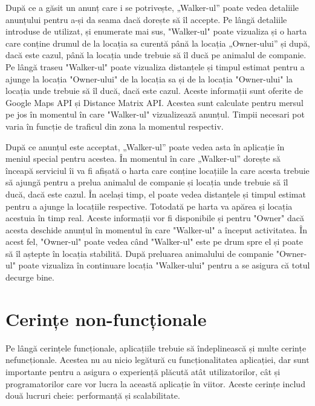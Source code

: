 După ce a găsit un anunț care i se potrivește, „Walker-ul” poate vedea detaliile anunțului pentru a-și da seama dacă dorește să îl accepte. Pe lângă detaliile introduse de utilizat, și enumerate mai sus, "Walker-ul" poate vizualiza și o harta care conține drumul de la locația sa curentă până la locația „Owner-ului” și după, dacă este cazul, până la locația unde trebuie să îl ducă pe animalul de companie. Pe lângă traseu "Walker-ul" poate vizualiza distanțele și timpul estimat pentru a ajunge la locația "Owner-ului" de la locația sa și de la locația "Owner-ului" la locația unde trebuie să îl ducă, dacă este cazul. Aceste informații sunt oferite de Google Maps API\cite{google_maps_platform} și Distance Matrix API\cite{distance_matrix}. Acestea sunt calculate pentru mersul pe jos în momentul în care "Walker-ul" vizualizează anunțul. Timpii necesari pot varia în funcție de traficul din zona la momentul respectiv.


După ce anunțul este acceptat, „Walker-ul” poate vedea asta în aplicație în meniul special pentru acestea. În momentul în care „Walker-ul” dorește să înceapă serviciul îi va fi afișată o harta care conține locațiile la care acesta trebuie să ajungă pentru a prelua animalul de companie și locația unde trebuie să îl ducă, dacă este cazul. În același timp, el poate vedea distanțele și timpul estimat pentru a ajunge la locațiile respective. Totodată pe harta va apărea și locația acestuia în timp real. Aceste informații vor fi disponibile și pentru "Owner" dacă acesta deschide anunțul în momentul în care "Walker-ul" a început activitatea. În acest fel, "Owner-ul" poate vedea când "Walker-ul" este pe drum spre el și poate să îl aștepte în locația stabilită. După preluarea animalului de companie "Owner-ul" poate vizualiza în continuare locația "Walker-ului" pentru a se asigura că totul decurge bine.



\section{Cerințe non-funcționale}
 
Pe lângă cerințele funcționale, aplicațiile trebuie să îndeplinească și multe cerințe nefuncționale. Acestea nu au nicio legătură cu funcționalitatea aplicației, dar sunt importante pentru a asigura o experiență plăcută atât utilizatorilor, cât și programatorilor care vor lucra la această aplicație în viitor. Aceste cerințe includ două lucruri cheie: performanță și scalabilitate. 

